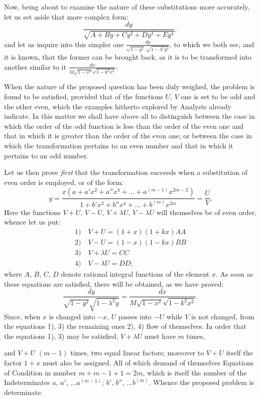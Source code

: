 \documentclass{article}
\begin{document}
Now, being about to examine the nature of these substitutions more accurately, let us set aside that more complex form:
\[
\frac{dy}{\sqrt{A+By+Cy^{2}+Dy^{3}+Ey^{4}}},
\]
and let us inquire into this simpler one $\frac{dy}{\sqrt{1-y^{2}}.\sqrt{1-\lambda^{2}y^{2}}}$, to which we both see, and it is known, that the former can be brought back, as it is to be transformed into another similar to it $\frac{dx}{M\sqrt{1-x^{2}}\sqrt{1-k^{2}x^{2}}}$.

When the nature of the proposed question has been duly weighed, the problem is found to be satisfied, provided that of the functions $U$, $V$ one is set to be odd and the other even, which the examples hitherto explored by Analysts already indicate. In this matter we shall have above all to distinguish between the case in which the order of the odd function is less than the order of the even one and that in which it is greater than the order of the even one; or between the case in which the transformation pertains to an even number and that in which it pertains to an odd number.

Let us then prove \emph{first} that the transformation succeeds when a substitution of even order is employed, or of the form:
\[
y=\frac{x\left(a+a'x^{2}+a''x^{4}+\ldots+a^{(m-1)}x^{2m-2}\right)}{1+b'x^{2}+b''x^{4}+\ldots+b^{(m)}x^{2m}}=\frac{U}{V}.
\]
Here the functions $V+U$, $V-U$, $V+\lambda U$, $V-\lambda U$ will themselves be of even order, whence let us put:
\[
\begin{gathered}
\text{1)}\quad V+U=(1+x)(1+kx)AA\\
\text{2)}\quad V-U=(1-x)(1-kx)BB\\
\text{3)}\quad V+\lambda U=CC\\
\text{4)}\quad V-\lambda U=DD;
\end{gathered}
\]
where $A$, $B$, $C$, $D$ denote rational integral functions of the element $x$. As soon as these equations are satisfied, there will be obtained, as we have proved:
\[
\frac{dy}{\sqrt{1-y^{2}}\sqrt{1-\lambda^{2}y}}=\frac{dx}{M\sqrt{1-x^{2}}\sqrt{1-k^{2}x^{2}}}.
\]
Since, when $x$ is changed into $-x$, $U$ passes into $-U$ while $V$ is not changed, from the equations 1), 3) the remaining ones 2), 4) flow of themselves. In order that the equations 1), 3) may be satisfied, $V+\lambda U$ must have $m$ times,

and $V+U$ $(m-1)$ times, two equal linear factors; moreover to $V+U$ itself the factor $1+x$ must also be assigned. All of which demand of themselves Equations of Condition in number $m+m-1+1=2m$, which is itself the number of the Indeterminates $a$, $a'$, $\ldots a^{(m-1)}$; $b'$, $b''$, $\ldots b^{(m)}$. Whence the proposed problem is determinate.
\end{document}
